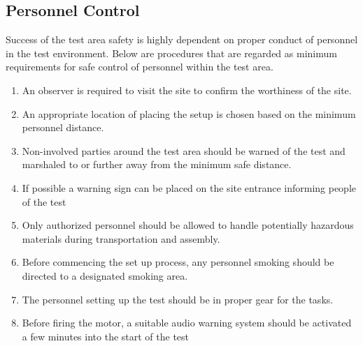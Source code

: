 \documentclass[12pt,letterpaper]{article}
\begin{document}
        \subsection{Personnel Control}
            \noindent Success of the test area safety is highly dependent
            on proper conduct of personnel in the test environment. Below
            are procedures that are regarded as minimum requirements for
            safe control of personnel within the test area.
            \begin{enumerate}
                \begin{enumerate}                  
                    \item An observer is required to visit the site to
                    confirm the worthiness of the site.
                    \item An appropriate location of placing the setup
                    is chosen based on the minimum personnel distance.
                    \item Non-involved parties around the test area
                    should be warned of the test and marshaled to or
                    further away from the minimum safe distance. 
                    \item If possible a warning sign can be placed on
                    the site entrance informing people of the test 
                    \item Only authorized personnel should be allowed to
                    handle potentially hazardous materials during
                    transportation and assembly.
                    \item Before commencing the set up process, any
                    personnel smoking should be directed to a designated
                    smoking area.
                    \item The personnel setting up the test should be in
                    proper gear for the tasks.
                    \item Before firing the motor, a suitable audio warning
                    system should be activated a few minutes into the start
                    of the test
                \end{enumerate}
            \end{enumerate}
\end{document}
